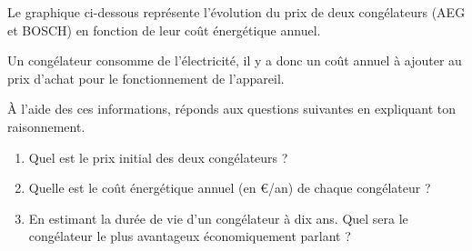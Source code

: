 %
%
    Le graphique ci-dessous représente l'évolution du prix de deux congélateurs (AEG et BOSCH) en fonction de leur coût énergétique annuel.

    Un congélateur consomme de l'électricité, il y a donc un coût annuel à ajouter au prix d'achat pour le fonctionnement de l'appareil.

    À l'aide des ces informations, réponds aux questions suivantes en expliquant ton raisonnement.
    \begin{enumerate}
        \item Quel est le prix initial des deux congélateurs ?
        \item Quelle est le coût énergétique annuel (en €/an) de chaque congélateur ?
        \item En estimant la durée de vie d'un congélateur à dix ans. Quel sera le congélateur le plus avantageux économiquement parlant ?
    \end{enumerate}
    \begin{center}
        
    \end{center}
